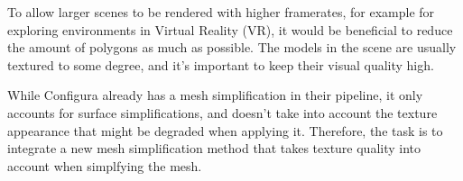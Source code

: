 To allow larger scenes to be rendered with higher framerates, for example for exploring environments in Virtual Reality (VR), it would be beneficial to reduce the amount of polygons as much as possible. The models in the scene are usually textured to some degree, and it's important to keep their visual quality high.

While Configura already has a mesh simplification in their pipeline, it only accounts for surface simplifications, and doesn't take into account the texture appearance that might be degraded when applying it. Therefore, the task is to integrate a new mesh simplification method that takes texture quality into account when simplfying the mesh. 



